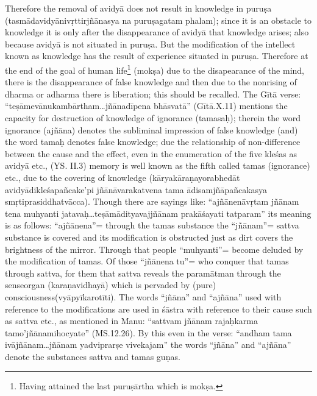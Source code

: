 Therefore the removal of avidyā does not result in knowledge in puruṣa  (tasmādavidyānivṛttirjñānasya na puruṣagatam phalam); since it is an obstacle to knowledge it is only after the disappearance of avidyā that knowledge arises; also because avidyā is not situated in puruṣa.  But the modification of the intellect known as knowledge has the result of experience situated in puruṣa. Therefore at the end of the goal of human life\footnote{Having attained the last puruṣārtha which is mokṣa.} (mokṣa) due to the disapearance of the mind, there is the disappearance of false knowledge and then due to the nonrising of dharma or adharma there is liberation; this should be recalled. The Gītā verse: “teṣāmevānukambārtham…jñānadīpena bhāsvatā” (Gītā.\-X.11) mentions the capacity for destruction of knowledge of ignorance (tamasaḥ); therein the word ignorance (ajñāna) denotes the subliminal impression of false knowledge (and) the word tamaḥ denotes false knowledge; due the relationship of non-difference between the cause and the effect, even in the enumeration of the five kleśas as avidyā etc., (YS. II.3) memory is well known as the fifth called tamas (ignorance) etc., due to the covering of knowledge   (kāryakāraṇayorabhedāt avidyādikleśapañcake’pi jñānāvarakatvena tama ādisamjñāpañcakasya smṛtiprasiddhatvācca). Though there are sayings like: “ajñānenāvṛtam jñānam tena muhyanti jatavaḥ…teṣāmādityavajjñānam prakāśayati tatparam” its meaning is as follows: “ajñānena”= through the tamas substance the “jñānam”= sattva substance is covered and its modification is obstructed just as dirt covers the brightness of the mirror.  Through that people “muhyanti”= become deluded by the modification of tamas. Of those “jñānena tu”= who conquer that tamas through sattva, for them that sattva reveals the paramātman through the sense\break organ (karaṇavidhayā) which is pervaded by (pure) consciousness\break (vyāpyīkarotīti). The words “jñāna” and “ajñāna” used with reference to the modifications are used in śāstra with reference to their cause such as sattva etc., as mentioned in Manu: “sattvam jñānam rajaḥ\break karma tamo’jñānamihocyate” (MS.12.26). By this even in the verse: “andham tama ivājñānam…jñānam yadviprarṣe vivekajam” the words “jñāna” and “ajñāna” denote the substances sattva and tamas guṇas.

